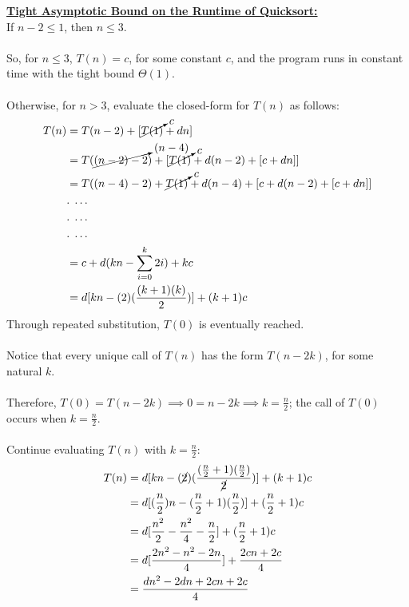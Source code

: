 \documentclass[12pt]{article}
\begin{document}
\textbf{\underline{Tight Asymptotic Bound on the Runtime of Quicksort:}} \\
If $n - 2 \leq 1$, then $n \leq 3$. \\
\\
So, for $n \leq 3$, $T(n) = c$, for some constant $c$, and the program runs in constant time with the tight bound $\Theta (1)$. \\
\\
Otherwise, for $n > 3$, evaluate the closed-form for $T(n)$ as follows:
\begin{equation*}
    \begin{aligned}
        T(n) &= T(n - 2) + [\cancelto{c}{T(1)} + dn] \\
        &= T(\cancelto{(n - 4)}{(n - 2) - 2}) + [\cancelto{c}{T(1)} + d(n - 2) + [c + dn]] \\
        &= T((n - 4) - 2) + \cancelto{c}{T(1)} + d(n - 4) + [c + d(n - 2) + [c + dn]] \\
        &. \; \dots \\
        &. \; \dots \\
        &. \; \dots \\
        &= c + d(kn - \sum_{i = 0}^{k} 2i) + kc \\
        &= d[kn - (2)(\frac{(k + 1)(k)}{2})] + (k + 1)c
    \end{aligned}
\end{equation*}
Through repeated substitution, $T(0)$ is eventually reached. \\
\\
Notice that every unique call of $T(n)$ has the form $T(n - 2k)$, for some natural $k$. \\
\\
Therefore, $T(0) = T(n - 2k) \implies 0 = n - 2k \implies k = \frac{n}{2}$; the call of $T(0)$ occurs when $k = \frac{n}{2}$. \\
\\
Continue evaluating $T(n)$ with $k = \frac{n}{2}$:
\begin{equation*}
    \begin{aligned}
        T(n) &= d[kn - (\cancel{2})(\frac{(\frac{n}{2} + 1)(\frac{n}{2})}{\cancel{2}})] + (k + 1)c \\
        &= d[(\frac{n}{2})n - (\frac{n}{2} + 1)(\frac{n}{2})] + (\frac{n}{2} + 1)c \\
        &= d[\frac{n^2}{2} - \frac{n^2}{4} - \frac{n}{2}] + (\frac{n}{2} + 1)c \\
        &= d[\frac{2n^2 - n^2 - 2n}{4}] + \frac{2cn + 2c}{4} \\
        &= \frac{dn^2 - 2dn + 2cn + 2c}{4}
    \end{aligned}
\end{equation*}
\end{document}

